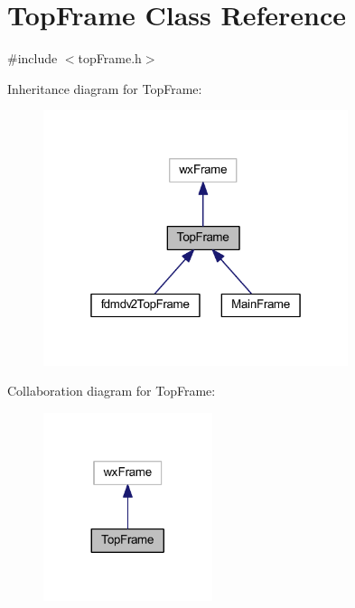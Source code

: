 \hypertarget{class_top_frame}{\section{Top\-Frame Class Reference}
\label{class_top_frame}
}


{\ttfamily \#include $<$top\-Frame.\-h$>$}



Inheritance diagram for Top\-Frame\-:
\nopagebreak
\begin{figure}[H]
\begin{center}
\leavevmode
\includegraphics[width=253pt]{class_top_frame__inherit__graph}
\end{center}
\end{figure}


Collaboration diagram for Top\-Frame\-:
\nopagebreak
\begin{figure}[H]
\begin{center}
\leavevmode
\includegraphics[width=140pt]{class_top_frame__coll__graph}
\end{center}
\end{figure}
